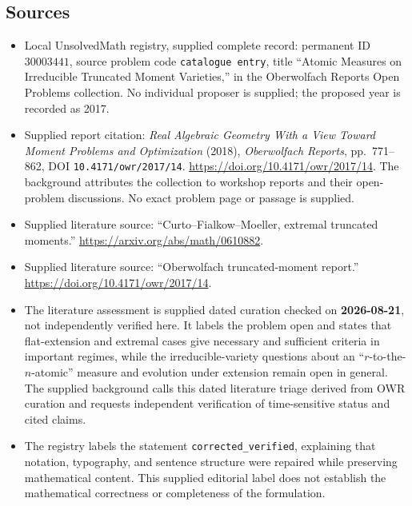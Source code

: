 \documentclass[11pt]{article}
\begin{document}
\subsection{Sources}
\begin{itemize}
\item Local UnsolvedMath registry, supplied complete record: permanent ID \(30003441\), source problem code \texttt{catalogue entry}, title ``Atomic Measures on Irreducible Truncated Moment Varieties,'' in the Oberwolfach Reports Open Problems collection. No individual proposer is supplied; the proposed year is recorded as 2017.
\item Supplied report citation: \emph{Real Algebraic Geometry With a View Toward Moment Problems and Optimization} (2018), \emph{Oberwolfach Reports}, pp.\ 771--862, DOI \texttt{10.4171/owr/2017/14}. \url{https://doi.org/10.4171/owr/2017/14}. The background attributes the collection to workshop reports and their open-problem discussions. No exact problem page or passage is supplied.
\item Supplied literature source: ``Curto--Fialkow--Moeller, extremal truncated moments.'' \url{https://arxiv.org/abs/math/0610882}.
\item Supplied literature source: ``Oberwolfach truncated-moment report.'' \url{https://doi.org/10.4171/owr/2017/14}.
\item The literature assessment is supplied dated curation checked on \textbf{2026-08-21}, not independently verified here. It labels the problem open and states that flat-extension and extremal cases give necessary and sufficient criteria in important regimes, while the irreducible-variety questions about an ``\(r\)-to-the-\(n\)-atomic'' measure and evolution under extension remain open in general. The supplied background calls this dated literature triage derived from OWR curation and requests independent verification of time-sensitive status and cited claims.
\item The registry labels the statement \texttt{corrected\_verified}, explaining that notation, typography, and sentence structure were repaired while preserving mathematical content. This supplied editorial label does not establish the mathematical correctness or completeness of the formulation.
\end{itemize}
\end{document}
